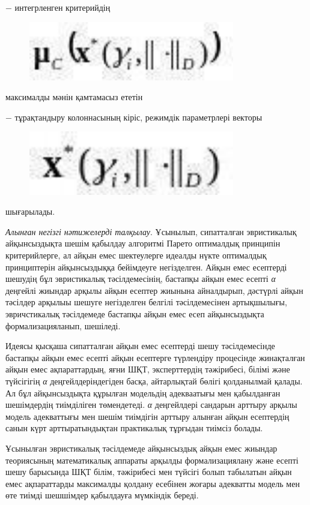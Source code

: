 − интегрленген критерийдің \begin{figure}[H]
	\centering
	\includegraphics[width=0.8\textwidth]{assets/261}
	\caption*{}
\end{figure}
максималды мәнін қамтамасыз ететін

− тұрақтандыру колоннасының кіріс, режимдік параметрлері векторы
\begin{figure}[H]
	\centering
	\includegraphics[width=0.8\textwidth]{assets/262}
	\caption*{}
\end{figure}шығарылады.

\emph{Алынған негізгі нәтижелерді талқылау}. Ұсынылып, сипатталған
эвристикалық айқынсыздықта шешім қабылдау алгоритмі Парето оптималдық
принципін критерийлерге, ал айқын емес шектеулерге идеалды нүкте
оптималдық принциптерін айқынсыздыққа бейімдеуге негізделген. Айқын емес
есептерді шешудің бұл эвристикалық тәсілдемесінің, бастапқы айқын емес
есепті \emph{α} деңгейлі жиындар арқылы айқын есептер жиынына
айналдырып, дәстүрлі айқын тәсілдер арқылыы шешуге негізделген белгілі
тәсілдемесінен артықшылығы, эвричстикалық тәсілдемеде бастапқы айқын
емес есеп айқынсыздықта формализацияланып, шешіледі.

Идеясы қысқаша сипатталған айқын емес есептерді шешу тәсілдемесінде
бастапқы айқын емес есепті айқын есептерге түрлендіру процесінде
жинақталған айқын емес ақпараттардың, яғни ШҚТ, эксперттердің
тәжірибесі, білімі және түйсігігің \emph{α} деңгейлдеріндегіден басқа,
айтарлықтай бөлігі қолданылмай қалады. Ал бұл айқынсыздықта құрылған
модельдің адекваатығы мен қабылданған шешімдердің тиімділіген
төмендетеді. \emph{α} деңгейлдері сандарын арттыру арқылы модель
адекваттығы мен шешім тиімдігін арттыру алынған айқын есептердің санын
күрт арттыратындықтан практикалық тұрғыдан тиімсіз болады.

Ұсынылған эвристикалық тәсілдемеде айқынсыздық айқын емес жиындар
теориясының математикалық аппараты арқылды формализациялану және есепті
шешу барысында ШҚТ білім, тәжірибесі мен түйсігі болып табылатын айқын
емес ақпараттарды максималды қолдану есебінен жоғары адекватты модель
мен өте тиімді шешшімдер қабылдауға мүмкіндік береді.


